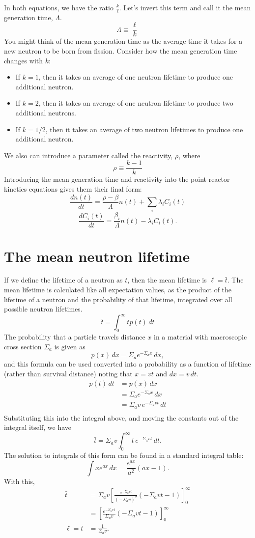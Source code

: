 \documentclass{report}
\begin{document}
In both equations, we have the ratio $\frac{k}{\ell}$. Let's invert this term and call it the mean generation time, $\Lambda$. 
$$ \Lambda \equiv \frac{\ell}{k} $$
You might think of the mean generation time as the average time it takes for a new neutron to be born from fission. Consider how the mean generation time changes with $k$:
\begin{itemize}
\item If $k=1$, then it takes an average of one neutron lifetime to produce one additional neutron.
\item If $k=2$, then it takes an average of one neutron lifetime to produce two additional neutrons.
\item If $k=1/2$, then it takes an average of two neutron lifetimes to produce one additional neutron.
\end{itemize}
We also can introduce a parameter called the reactivity, $\rho$, where
$$ \rho \equiv \frac{k-1}{k} $$
Introducing the mean generation time and reactivity into the point reactor kinetics equations gives them their final form:
$$ \frac{dn(t)}{dt} = \frac{\rho-\beta}{\Lambda}n(t) + \sum_i \lambda_i C_i(t) $$
$$ \frac{dC_i(t)}{dt} =  \frac{\beta_i}{\Lambda} n(t) - \lambda_i C_i(t) .$$


\newpage
\section*{The mean neutron lifetime}
\label{meanlifetime}
If we define the lifetime of a neutron as $t$, then the mean lifetime is $\ell = \bar{t}$. The mean lifetime is calculated like all expectation values, as the product of the lifetime of a neutron and the probability of that lifetime, integrated over all possible neutron lifetimes.
$$\bar{t} = \int_0^{\infty} t p(t) \, dt $$
The probability that a particle travels distance $x$ in a material with macroscopic cross section $\Sigma_a$ is given as
$$ p(x) \, dx = \Sigma_a e^{-\Sigma_a x} \, dx ,$$		 									
and this formula can be used converted into a probability as a function of lifetime (rather than survival distance) noting that $x = vt$ and $dx = v\,dt$. 
\begin{align*}
p(t) \, dt	&= p(x) \, dx \\
			&= \Sigma_a e^{-\Sigma_a x} \, dx \\
			&= \Sigma_a v \, e^{-\Sigma_a vt} \, dt \\
\end{align*}
Substituting this into the integral above, and moving the constants out of the integral itself, we have
$$ \bar{t} = \Sigma_a v\int_0^{\infty} t \, e^{-\Sigma_a vt} \, dt .$$
The solution to integrals of this form can be found in a standard integral table:
$$ \int x e^{ax} \, dx = \frac{e^{ax}}{a^2}(ax-1) .$$   
With this, 
\begin{align*}
\bar{t}	&= \Sigma_a v \left[ \frac{e^{-\Sigma_a vt}}{\left(-\Sigma_a v\right)^2}(-\Sigma_a v t-1) \right]_0^{\infty} \\
		&= \left[ \frac{e^{-\Sigma_a vt}}{\Sigma_a v}(-\Sigma_a v t-1) \right]_0^{\infty} \\
\ell = \bar{t}	&= \frac{1}{\Sigma_a v} . \end{align*}
\end{document}
